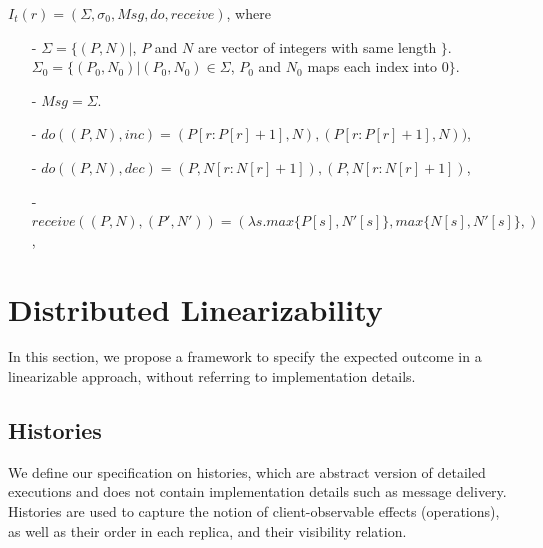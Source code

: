 \begin{example}
\label{definition:state-based PN-counter}
$I_t(r) = (\Sigma, \sigma_0, \mathit{Msg}, \mathit{do},\mathit{receive})$, where

\begin{itemize}
\setlength{\itemsep}{0.5pt}
\item[-] $\Sigma = \{ (P,N) \vert$, $P$ and $N$ are vector of integers with same length $\}$. $\Sigma_0 = \{ (P_0,N_0) \vert (P_0,N_0) \in \Sigma$, $P_0$ and $N_0$ maps each index into $0 \}$.

\item[-] $\mathit{Msg} = \Sigma$.

\item[-] $\mathit{do}((P,N),\mathit{inc}) = (P[r:P[r]+1],N),(P[r:P[r]+1],N))$,

\item[-] $\mathit{do}((P,N),\mathit{dec}) = (P,N[r:N[r]+1]),(P,N[r:N[r]+1])$,

\item[-] $\mathit{receive}((P,N),(P',N')) = (\lambda s. \mathit{max}\{  P[s], N'[s] \}, \mathit{max}\{  N[s], N'[s] \},)$,
\end{itemize}
\end{example}





















\section{Distributed Linearizability}
\label{sec:distributed-lin}

In this section, we propose a framework to specify the expected outcome in a linearizable approach, without referring to implementation details.



\subsection{Histories}
\label{subsec:histories}

We define our specification on histories, which are abstract version of detailed executions and does not contain implementation details such as message delivery. Histories are used to capture the notion of client-observable effects (operations), as well as their order in each replica, and their visibility relation.

